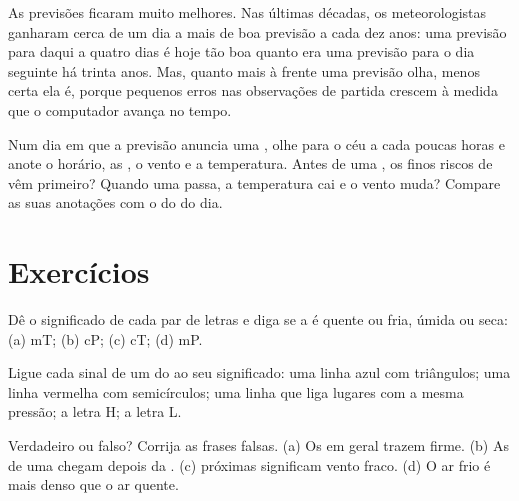 As previsões ficaram muito melhores. Nas últimas décadas, os
meteorologistas ganharam cerca de um dia a mais de boa previsão a cada dez
anos: uma previsão para daqui a quatro dias é hoje tão boa quanto era uma
previsão para o dia seguinte há trinta anos. Mas, quanto mais à frente uma
previsão olha, menos certa ela é, porque pequenos erros nas observações
de partida crescem à medida que o computador avança no tempo.

\begin{inthefield}
Num dia em que a previsão anuncia uma , olhe para o céu a cada
poucas horas e anote o horário, as , o vento e a temperatura. Antes
de uma , os finos riscos de  vêm primeiro? Quando uma
 passa, a temperatura cai e o vento muda? Compare as suas
anotações com o  do  do dia.
\end{inthefield}

\section{Exercícios}

\begin{exercise}[$\star$]\label{exo:g8:fronts-and-weather-maps:1}
Dê o significado de cada par de letras e diga se a  é quente ou
fria, úmida ou seca: (a) mT; (b) cP; (c) cT; (d) mP.
\end{exercise}

\begin{exercise}[$\star$]\label{exo:g8:fronts-and-weather-maps:2}
Ligue cada sinal de um  do  ao seu significado: uma linha azul
com triângulos; uma linha vermelha com semicírculos; uma linha que liga
lugares com a mesma pressão; a letra H; a letra L.
\end{exercise}

\begin{exercise}[$\star$]\label{exo:g8:fronts-and-weather-maps:3}
Verdadeiro ou falso? Corrija as frases falsas. (a) Os  em
geral trazem  firme. (b) As  de uma  chegam depois
da . (c)  próximas significam vento fraco. (d) O ar frio é
mais denso que o ar quente.
\end{exercise}

